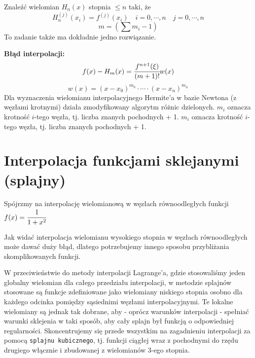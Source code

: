 \documentclass[hidelinks,a4paper,fleqn,oneside]{book}
\begin{document}
Znaleźć wielomian $H_n(x)$ stopnia $\leq n$ taki, że
\[
	H_n^{(j)}(x_i) = f^{(j)}(x_i) \quad i = 0, \cdots, n \quad j = 0, \cdots, n
\] 
\[
	m = (\sum m_i - 1)
\]
To zadanie także ma dokładnie jedno rozwiązanie.

\textbf{Błąd interpolacji:}
\[
f(x) - H_m(x) = \cfrac{f^{n+1}(\xi)}{(m+1)!}w(x)
\]
\[
	w(x) = (x-x_0)^{m_0} \cdot \cdots \cdot (x - x_n)^{m_n}
\]
Dla wyznaczenia wielomianu interpolacyjnego Hermite'a w bazie Newtona (z węzłami krotnymi) działa zmodyfikowany algorytm różnic dzielonych. $m_i$ oznacza krotność $i$-tego węzła, tj. liczba znanych pochodnych + 1. $m_i$ oznacza krotność $i$-tego węzła, tj. liczba znanych pochodnych + 1.

\section{Interpolacja funkcjami sklejanymi (splajny)}
Spójrzmy na interpolację wielomianową w węzłach równoodległych funkcji $f(x) = \cfrac{1}{1+x^2}$


Jak widać interpolacja wielomianu wysokiego stopnia w węzłach równoodległych może dawać duży błąd, dlatego potrzebujemy innego sposobu przybliżania skomplikowanych funkcji.

W przeciwieństwie do metody interpolacji Lagrange'a, gdzie stosowaliśmy jeden globalny wielomian dla całego przedziału interpolacji, w metodzie splajnów stosowane są funkcje zdefiniowane jako wielomiany niskiego stopnia osobno dla każdego odcinka pomiędzy sąsiednimi węzłami interpolacyjnymi. Te lokalne wielomiany są jednak tak dobrane, aby - oprócz warunków interpolacji - spełniać warunki sklejenia w taki sposób, aby cały splajn był funkcją o odpowiedniej regularności. Skoncentrujemy się przede wszystkim na zagadnieniu interpolacji za pomocą \texttt{splajnu kubicznego}, tj. funkcji ciągłej wraz z pochodnymi do rzędu drugiego włącznie i zbudowanej z wielomianów 3-ego stopnia. 
\end{document}
